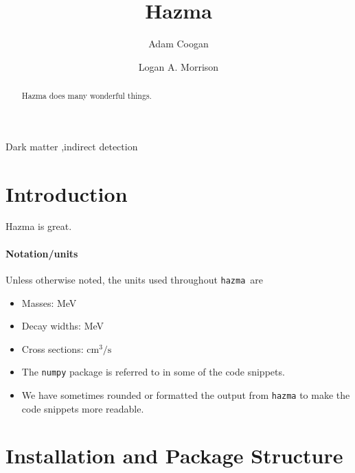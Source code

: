 \documentclass[review]{elsarticle}
\newcommand{\mil}[1]{\texttt{#1}}
\renewcommand\u[1]{{\mathrm{#1}}}
\newcommand{\hazma}{\mil{hazma}}
\begin{document}
\begin{frontmatter}

	\title{Hazma}

	\author[grappa,ucsc,scipp]{Adam Coogan}

	\author[ucsc,scipp]{Logan A. Morrison}

	\address[grappa]{GRAPPA, Institute of Physics, University of Amsterdam, 1098 XH Amsterdam, The Netherlands}
	\address[ucsc]{Department of Physics, 1156 High St., University of California Santa Cruz, Santa Cruz, CA 95064, USA}
	\address[scipp]{Santa Cruz Institute for Particle Physics, 1156 High St., Santa Cruz, CA 95064, USA}

	\begin{abstract}
		Hazma does many wonderful things.
	\end{abstract}

	\begin{keyword}
		Dark matter \sep indirect detection
	\end{keyword}

\end{frontmatter}

\section{Introduction}

Hazma is great.

\paragraph{Notation/units} Unless otherwise noted, the units used throughout \hazma\ are
\begin{itemize}
	\item Masses: MeV
	\item Decay widths: MeV
	\item Cross sections: $\u{cm}^3 / \u{s}$
	\item The \mil{numpy} package is referred to in some of the code snippets.
	\item We have sometimes rounded or formatted the output from \mil{hazma} to make the code snippets more readable.
\end{itemize}

\section{Installation and Package Structure}%
\label{sec:installation}
\end{document}
